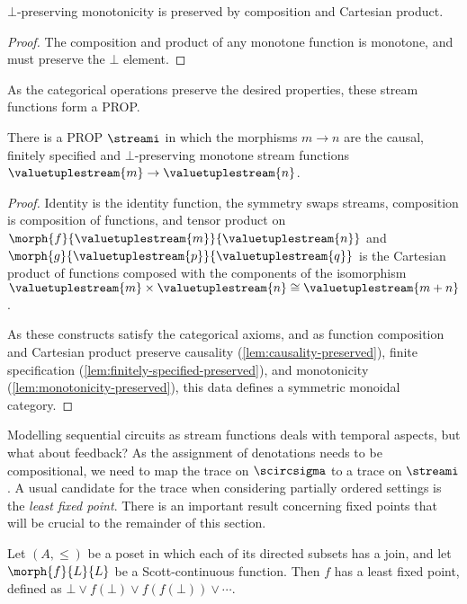 \documentclass{lmcs}
\begin{document}
\begin{lem}\label{lem:monotonicity-preserved}
    \(\bot\)-preserving monotonicity is preserved by composition and Cartesian
    product.
\end{lem}
\begin{proof}
    The composition and product of any monotone function is monotone, and must
    preserve the \(\bot\) element.
\end{proof}

As the categorical operations preserve the desired properties, these stream
functions form a PROP.

\begin{prop}
    There is a PROP \(\streami\) in which the morphisms \(m \to n\) are the
    causal, finitely specified and \(\bot\)-preserving monotone stream
    functions \(\valuetuplestream{m} \to \valuetuplestream{n}\).
\end{prop}
\begin{proof}
    Identity is the identity function, the symmetry swaps streams, composition
    is composition of functions, and tensor product on
    \(\morph{f}{\valuetuplestream{m}}{\valuetuplestream{n}}\) and
    \(\morph{g}{\valuetuplestream{p}}{\valuetuplestream{q}}\) is the Cartesian
    product of functions composed with the components of the isomorphism
    \(\valuetuplestream{m} \times \valuetuplestream{n}
    \cong \valuetuplestream{m+n}\).

    As these constructs satisfy the categorical axioms, and as function
    composition and Cartesian product preserve causality
    (\autoref{lem:causality-preserved}),
    finite specification (\autoref{lem:finitely-specified-preserved}),
    and monotonicity (\autoref{lem:monotonicity-preserved}), this data defines a
    symmetric monoidal category.
\end{proof}

Modelling sequential circuits as stream functions deals with temporal
aspects, but what about feedback?
As the assignment of denotations needs to be compositional, we need
to map the trace on \(\scircsigma\) to a trace on \(\streami\).
A usual candidate for the trace when considering partially ordered settings is
the \emph{least fixed point}.
There is an important result concerning fixed points that will be crucial to
the remainder of this section.

\begin{thm}
    Let \((A, \leq)\) be a poset in which each of its directed subsets has a
    join, and let \(\morph{f}{L}{L}\) be a Scott-continuous function.
    Then \(f\) has a least fixed point, defined as \(
    \bot \vee f(\bot) \vee f(f(\bot)) \vee \cdots
    \).
\end{thm}
\end{document}
